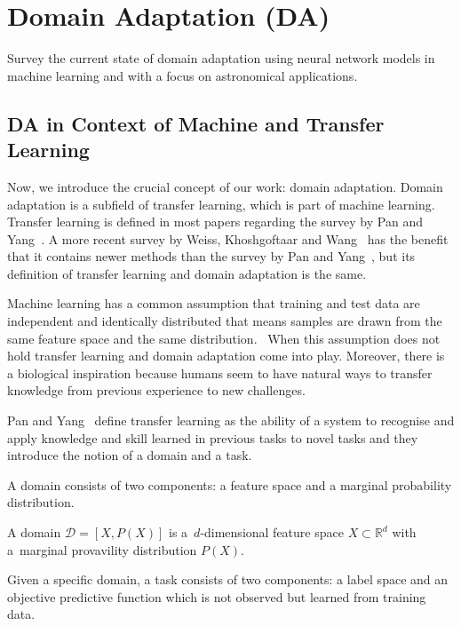 \chapter{Domain Adaptation (DA)}
\label{da_chapter}

Survey the current state of domain adaptation using neural network models in machine learning and with a focus on astronomical applications.


\section{DA in Context of Machine and Transfer Learning}

Now, we introduce the crucial concept of our work: domain adaptation.
Domain adaptation is a subfield of transfer learning,
which is part of machine learning.
Transfer learning is defined in most papers regarding the survey by Pan and Yang~\cite{pan2010}.
A more recent survey by Weiss, Khoshgoftaar and Wang~\cite{weiss2016} has the benefit
that it contains newer methods than the survey by Pan and Yang~\cite{pan2010},
but its definition of transfer learning and domain adaptation is the same.

Machine learning has a common assumption that training and test data are independent and identically distributed
that means samples are drawn from the same feature space and the same distribution.~\cite{daume2006}
When this assumption does not hold transfer learning and domain adaptation come into play.
Moreover, there is a biological inspiration
because humans seem to have natural ways to transfer knowledge from previous experience to new challenges.~\cite{torrey2010}

Pan and Yang~\cite{pan2010} define transfer learning
as the ability of a system to recognise and apply knowledge and skill
learned in previous tasks to novel tasks
and they introduce the notion of a domain and a task.

A domain consists of two components: a feature space and a marginal probability distribution.

\begin{definition}
	A domain \(\mathcal{D} = [X, P(X)]\)
	is a~\(d\)-dimensional feature space \(X \subset \mathbb{R}^d\)
	with a~marginal provavility distribution \(P(X)\).~\cite{pan2010}
\end{definition}

Given a specific domain, a task consists of two components: a label space and an objective predictive function
which is not observed but learned from training data.

